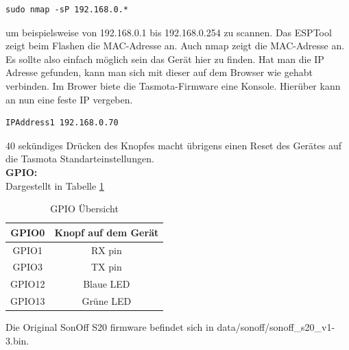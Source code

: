 \documentclass[11pt,fleqn]{book} %
\numberwithin{equation}{section} %
\numberwithin{figure}{section} %
\numberwithin{table}{section} %
\begin{document}
\begin{lstlisting}
sudo nmap -sP 192.168.0.*
\end{lstlisting}
um beispielsweise von 192.168.0.1 bis 192.168.0.254 zu scannen. Das ESPTool zeigt beim Flashen die MAC-Adresse an. Auch nmap zeigt die MAC-Adresse an. Es sollte also einfach möglich sein das Gerät hier zu finden. Hat man die IP Adresse gefunden, kann man sich mit dieser auf dem Browser wie gehabt verbinden. Im Brower biete die Tasmota-Firmware eine Konsole. Hierüber kann an nun eine feste IP vergeben. 
\begin{lstlisting}
IPAddress1 192.168.0.70
\end{lstlisting}
40 sekündiges Drücken des Knopfes macht übrigens einen Reset des Gerätes auf die Tasmota Standarteinstellungen.\\ 
\textbf{GPIO:}\\
Dargestellt in Tabelle \ref{tab:sonoff-gpio}
\begin{table}[H]
\center 
 \begin{tabular}{|c|c|}\hline
GPIO0 & Knopf auf dem Gerät\\ \hline
GPIO1 & RX pin\\ \hline
GPIO3 & TX pin\\ \hline
GPIO12 & Blaue LED\\ \hline
GPIO13 & Grüne LED\\ \hline
 \end{tabular}
 \caption{GPIO Übersicht \label{tab:sonoff-gpio}}
 \end{table}
 Die Original SonOff S20 firmware befindet sich in data/sonoff/sonoff\_s20\_v1-3.bin.
\end{document}
